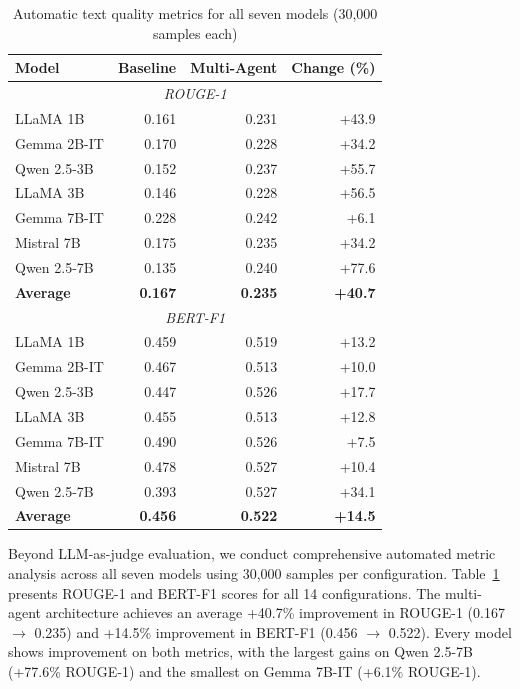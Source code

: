 \begin{table}[h]
\centering
\caption{Automatic text quality metrics for all seven models (30,000 samples each)}
\label{tab:textquality_all}
\begin{tabular}{lrrr}
\toprule
\textbf{Model} & \textbf{Baseline} & \textbf{Multi-Agent} & \textbf{Change (\%)} \\
\midrule
\multicolumn{4}{c}{\textit{ROUGE-1}} \\
\midrule
LLaMA 1B & 0.161 & 0.231 & +43.9 \\
Gemma 2B-IT & 0.170 & 0.228 & +34.2 \\
Qwen 2.5-3B & 0.152 & 0.237 & +55.7 \\
LLaMA 3B & 0.146 & 0.228 & +56.5 \\
Gemma 7B-IT & 0.228 & 0.242 & +6.1 \\
Mistral 7B & 0.175 & 0.235 & +34.2 \\
Qwen 2.5-7B & 0.135 & 0.240 & +77.6 \\
\midrule
\textbf{Average} & \textbf{0.167} & \textbf{0.235} & \textbf{+40.7} \\
\midrule
\multicolumn{4}{c}{\textit{BERT-F1}} \\
\midrule
LLaMA 1B & 0.459 & 0.519 & +13.2 \\
Gemma 2B-IT & 0.467 & 0.513 & +10.0 \\
Qwen 2.5-3B & 0.447 & 0.526 & +17.7 \\
LLaMA 3B & 0.455 & 0.513 & +12.8 \\
Gemma 7B-IT & 0.490 & 0.526 & +7.5 \\
Mistral 7B & 0.478 & 0.527 & +10.4 \\
Qwen 2.5-7B & 0.393 & 0.527 & +34.1 \\
\midrule
\textbf{Average} & \textbf{0.456} & \textbf{0.522} & \textbf{+14.5} \\
\bottomrule
\end{tabular}
\end{table}

Beyond LLM-as-judge evaluation, we conduct comprehensive automated metric analysis across all seven models using 30,000 samples per configuration. Table~\ref{tab:textquality_all} presents ROUGE-1 and BERT-F1 scores for all 14 configurations. The multi-agent architecture achieves an average +40.7\% improvement in ROUGE-1 (0.167 $\rightarrow$ 0.235) and +14.5\% improvement in BERT-F1 (0.456 $\rightarrow$ 0.522). Every model shows improvement on both metrics, with the largest gains on Qwen 2.5-7B (+77.6\% ROUGE-1) and the smallest on Gemma 7B-IT (+6.1\% ROUGE-1).

